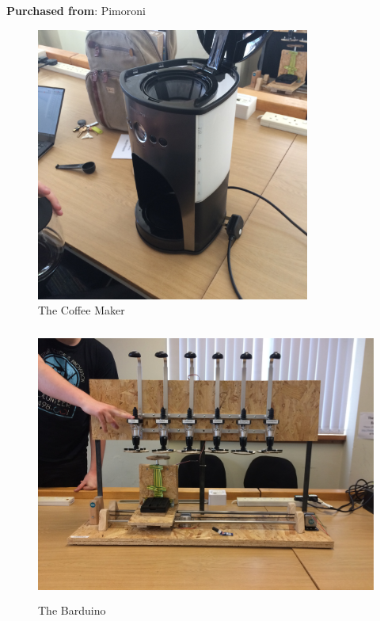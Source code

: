 \documentclass[11pt, a4paper]{article}
\begin{document}
\textbf{Purchased from}: Pimoroni
\newpage

\begin{figure}[H]
    \centering    
    \includegraphics[height=9cm, angle=270]{images/coffee}
    \caption{The Coffee Maker}
\end{figure}

\begin{figure}[H]
    \centering    
    \includegraphics[height=9cm]{images/barduino}
    \caption{The Barduino}
\end{figure}

\end{document}
